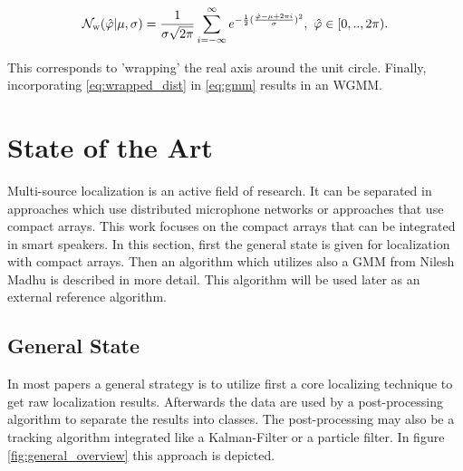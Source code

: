 \begin{equation}
\mathcal{N}_\text{w}(\hat{\varphi}|\mu,\sigma)=\frac{1}{\sigma\sqrt{2\pi}}\sum^\infty_{i=-\infty}e^{-\frac{1}{2}(\frac{\hat{\varphi}-\mu+2\pi i}{\sigma})^2},\ \hat{\varphi} \in [0,..,2\pi).
\label{eq:wrapped_dist}
\end{equation}




This corresponds to 'wrapping' the real axis around the unit circle. Finally, incorporating \ref{eq:wrapped_dist} in \ref{eq:gmm} results in an \ac{WGMM}. \cite[Chapter~2.3.8]{bishop2016pattern}

\section{State of the Art}
\label{sec:state_of_art}

Multi-source localization is an active field of research. It can be separated in approaches which use distributed microphone networks \cite{brutti2008localization,sheng2005maximum,hummes2011robust} or approaches that use compact arrays. This work focuses on the compact arrays that can be integrated in smart speakers. In this section, first the general state is given for localization with compact arrays. Then an algorithm which utilizes also a \ac{GMM} from Nilesh Madhu is described in more detail. This algorithm will be used later as an external reference algorithm.

\subsection{General State}
In most papers a general strategy is to utilize first a core localizing technique to get raw localization results. Afterwards the data are used by a post-processing algorithm to separate the results into classes. The post-processing may also be a tracking algorithm integrated like a Kalman-Filter or a particle filter. In figure \ref{fig:general_overview} this approach is depicted.


